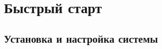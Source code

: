 \documentclass[a4paper,11pt]{book}
\begin{document}
	


\frontmatter



	\cleardoublepage
	\begingroup
	\small
	\normalbaselines \setlength{\medskipamount}{3pt plus 1pt minus 1pt}
	\setcounter{tocdepth}{2}\thispagestyle{empty}\tableofcontents
	\endgroup


	


\mainmatter

	\part{Быстрый старт}


	\chapter{Установка и настройка системы}\label{CH:Setup}
\end{document}
